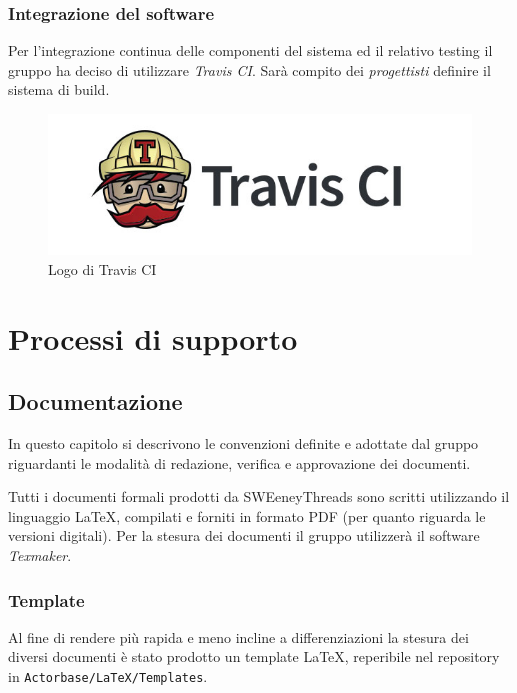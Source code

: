\documentclass[a4paper]{article}
\begin{document}
		\subsubsection{Integrazione del software}
		Per l'integrazione continua delle componenti del sistema ed il relativo testing il gruppo ha deciso di utilizzare \emph{Travis CI}. Sarà compito dei \emph{progettisti} definire il sistema di build.
		\begin{figure}[H]
				\centering
				\includegraphics[scale=0.5]{travis.png}
				\caption{Logo di Travis CI}
			\end{figure}

	\newpage
	\section{Processi di supporto}
	
		\subsection{Documentazione}
		In questo capitolo si descrivono le convenzioni definite e adottate dal gruppo riguardanti le
		modalità di redazione, verifica e approvazione dei documenti.

		Tutti i documenti formali prodotti da SWEeneyThreads sono scritti utilizzando il linguaggio \LaTeX,
		compilati e forniti in formato PDF (per quanto riguarda le versioni digitali). Per la stesura dei
		documenti il gruppo utilizzerà il software \emph{Texmaker}.
		\subsubsection{Template}
		Al fine di rendere più rapida e meno incline a differenziazioni la stesura dei diversi documenti è stato prodotto un
		template \LaTeX, reperibile nel repository in \verb|Actorbase/LaTeX/Templates|.
\end{document}
